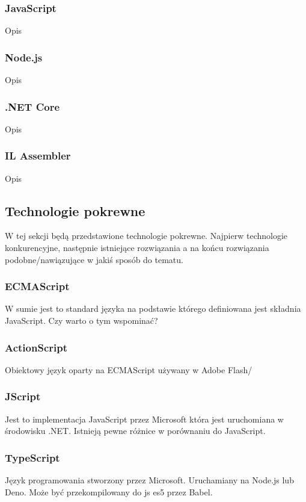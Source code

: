 \documentclass[a4paper]{article}
\begin{document}
\subsubsection{JavaScript}
Opis
%

\subsubsection{Node.js}
Opis
\subsubsection{.NET Core}
Opis
\subsubsection{IL Assembler}
Opis

\subsection{Technologie pokrewne}
W tej sekcji będą przedstawione technologie pokrewne.
Najpierw technologie konkurencyjne, następnie istniejące rozwiązania a na końcu rozwiązania podobne/nawiązujące w jakiś sposób do tematu.

\subsubsection{ECMAScript}
W sumie jest to standard języka na podstawie którego definiowana jest składnia JavaScript. Czy warto o tym wspominać?

\subsubsection{ActionScript}
Obiektowy język oparty na ECMAScript używany w Adobe Flash/

\subsubsection{JScript}
Jest to implementacja JavaScript przez Microsoft która jest uruchomiana w środowisku .NET.
Istnieją pewne różnice w porównaniu do JavaScript.

\subsubsection{TypeScript}
Język programowania stworzony przez Microsoft. Uruchamiany na Node.js lub Deno. Może być przekompilowany do js es5 przez Babel.
\end{document}

